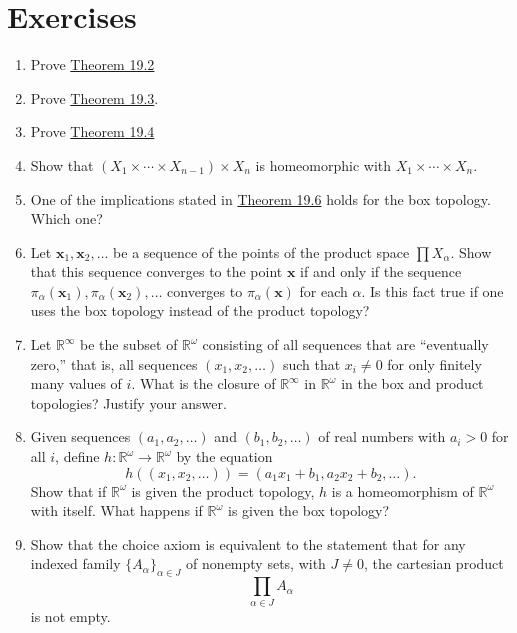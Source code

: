 \section*{Exercises}
\begin{enumerate}[itemsep=0.4em, parsep=0pt, topsep=0pt, partopsep=0pt, leftmargin=*, label=\arabic*., ref=\arabic*]
\item Prove \hyperref[thm:19.2]{Theorem 19.2}
\item Prove \hyperref[thm:19.3]{Theorem 19.3}.
\item Prove \hyperref[thm:19.4]{Theorem 19.4}
\item Show that \(( {X_{1} \times \cdots \times {X}_{n - 1}}) \times {X}_{n}\) is homeomorphic with \(X_{1} \times \cdots \times {X}_{n}\).
\item One of the implications stated in \hyperref[thm:19.6]{Theorem 19.6} holds for the box topology. Which one?
\item Let \(\mathbf{x}_{1},\mathbf{x}_{2},\ldots\) be a sequence of the points of the product space \(\prod {X}_{\alpha }\). Show that this sequence converges to the point \(\mathbf{x}\) if and only if the sequence \({\pi }_{\alpha }( \mathbf{x}_{1}),{\pi }_{\alpha }( \mathbf{x}_{2}),\ldots\) converges to \({\pi }_{\alpha }( \mathbf{x})\) for each \(\alpha\). Is this fact true if one uses the box topology instead of the product topology?
\item Let \( \mathbb{R}^{\infty }\) be the subset of \(\mathbb{R}^{\omega }\) consisting of all sequences that are ``eventually zero,'' that is, all sequences \(( {x_{1},x_{2},\ldots })\) such that \(x_{i} \neq 0\) for only finitely many values of \(i\). What is the closure of \(\mathbb{R}^{\infty }\) in \(\mathbb{R}^{\omega }\) in the box and product topologies? Justify your answer.
\item Given sequences \(( {a_{1},a_{2},\ldots })\) and \(( {b_{1},b_{2},\ldots })\) of real numbers with \(a_{i} > 0\) for all \(i\), define \(h : \mathbb{R}^{\omega } \rightarrow {\mathbb{R}}^{\omega }\) by the equation \[ h( ( {x_{1},x_{2},\ldots }) ) = ( {a_{1}x_{1} + b_{1},a_{2}x_{2} + b_{2},\ldots }). \] Show that if \(\mathbb{R}^{\omega }\) is given the product topology, \(h\) is a homeomorphism of \(\mathbb{R}^{\omega }\) with itself. What happens if \(\mathbb{R}^{\omega }\) is given the box topology?
\item Show that the choice axiom is equivalent to the statement that for any indexed family \({\{ A_{\alpha }\} }_{\alpha \in J}\) of nonempty sets, with \(J \neq 0\), the cartesian product \[ \mathop{\prod }\limits_{{\alpha \in J}}A_{\alpha } \] is not empty.

\end{enumerate}
